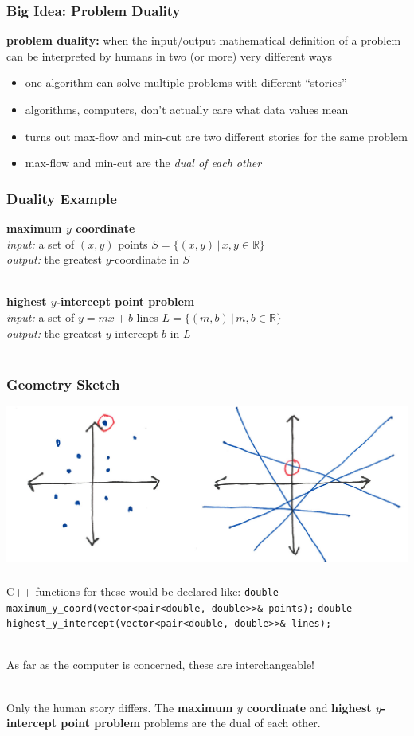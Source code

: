 \documentclass{beamer}
\newcommand{\stanza}{ \\~\ }
\begin{document}
\begin{frame} \frametitle{Big Idea: Problem Duality}
\textbf{problem duality:} when the input/output mathematical definition of a
problem can be interpreted by humans in two (or more) very different ways
\begin{itemize}
  \item one algorithm can solve multiple problems with different ``stories''
  \item algorithms, computers, don't actually care what data values mean
  \item turns out max-flow and min-cut are two different stories for the same problem
  \item max-flow and min-cut are the \emph{dual of each other}
\end{itemize}
\end{frame}

\begin{frame} \frametitle{Duality Example}
\textbf{maximum $y$ coordinate} \\
\emph{input: } a set of $(x, y)$ points $S=\{(x, y) \, | \, x, y \in \mathbb{R} \}$ \\
\emph{output: } the greatest $y$-coordinate in $S$ \stanza

\textbf{highest $y$-intercept point problem} \\
\emph{input: } a set of $y=mx+b$ lines $L=\{(m, b) \, | \, m, b \in \mathbb{R} \}$ \\
\emph{output: } the greatest $y$-intercept $b$ in $L$ \stanza
\end{frame}

\begin{frame} \frametitle{Geometry Sketch}
\begin{center}
\includegraphics{lines.png}
\end{center}
\end{frame}

\begin{frame} \frametitle{}
C++ functions for these would be declared like:
\lstinline!double maximum_y_coord(vector<pair<double, double>>& points);!
\lstinline!double highest_y_intercept(vector<pair<double, double>>& lines);! \stanza

As far as the computer is concerned, these are interchangeable! \stanza

Only the human story differs.
The
\textbf{maximum $y$ coordinate}
and
\textbf{highest $y$-intercept point problem}
problems are the dual of each other.
\end{frame}
\end{document}
